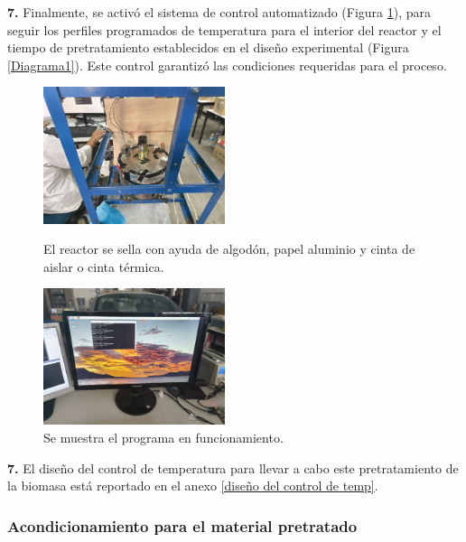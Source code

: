 \documentclass[12pt]{article}
\begin{document}
			\textbf{7.} Finalmente, se activó el sistema de control automatizado (Figura \ref{programa}), para seguir los perfiles programados de temperatura para el interior del reactor y el tiempo de pretratamiento establecidos en el diseño experimental (Figura \ref{Diagrama1}). Este control garantizó las condiciones requeridas para el proceso.
			
			
			\begin{figure}[H]
				\centering
				\begin{minipage}{0.46\textwidth}
					\centering
					\includegraphics[width=\linewidth, height=4cm, keepaspectratio]{imagenes/sellado2}
					\caption{El reactor se sella con ayuda de algodón, papel aluminio y cinta de aislar o cinta térmica.}
					\label{sellado_bio}
				\end{minipage}
				\hfill
				\begin{minipage}{0.48\textwidth}
					\centering
					\includegraphics[width=\linewidth, height=4cm, keepaspectratio]{imagenes/programa3}
					\caption{Se muestra el programa en funcionamiento.}
					\label{programa}
				\end{minipage}
			\end{figure}
			
			\textbf{7.} El diseño del control de temperatura para llevar a cabo este pretratamiento de la biomasa está reportado en el anexo \ref{diseño del control de temp}.
			
			
			
			
			\subsubsection{Acondicionamiento para el material pretratado}
			
\end{document}
